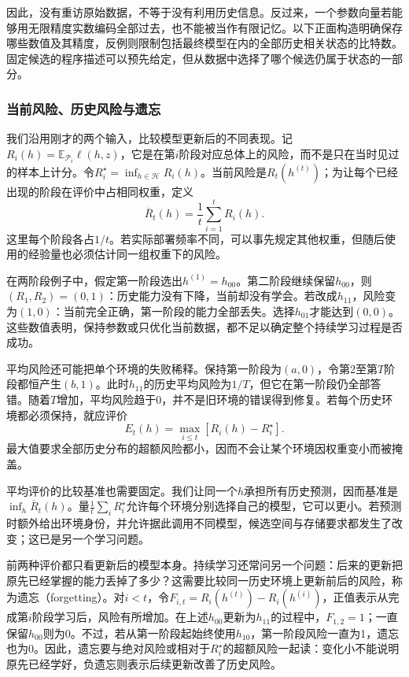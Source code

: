 因此，没有重访原始数据，不等于没有利用历史信息。反过来，一个参数向量若能够用无限精度实数编码全部过去，也不能被当作有限记忆。以下正面构造明确保存哪些数值及其精度，反例则限制包括最终模型在内的全部历史相关状态的比特数。固定候选的程序描述可以预先给定，但从数据中选择了哪个候选仍属于状态的一部分。

\subsubsection{当前风险、历史风险与遗忘}

我们沿用刚才的两个输入，比较模型更新后的不同表现。记$R_i(h)=\mathbb E_{\mathcal P_i}\ell(h,z)$，它是在第$i$阶段对应总体上的风险，而不是只在当时见过的样本上计分。令$R_i^\star=\inf_{h\in\mathcal H}R_i(h)$。当前风险是$R_t(h^{(t)})$；为让每个已经出现的阶段在评价中占相同权重，定义
\begin{equation}
 \overline R_t(h)=\frac1t\sum_{i=1}^tR_i(h).
 \label{eq:continual-average-risk}
\end{equation}
这里每个阶段各占$1/t$。若实际部署频率不同，可以事先规定其他权重，但随后使用的经验量也必须估计同一组权重下的风险。

在两阶段例子中，假定第一阶段选出$h^{(1)}=h_{00}$。第二阶段继续保留$h_{00}$，则$(R_1,R_2)=(0,1)$：历史能力没有下降，当前却没有学会。若改成$h_{11}$，风险变为$(1,0)$：当前完全正确，第一阶段的能力全部丢失。选择$h_{01}$才能达到$(0,0)$。这些数值表明，保持参数或只优化当前数据，都不足以确定整个持续学习过程是否成功。

平均风险还可能把单个环境的失败稀释。保持第一阶段为$(a,0)$，令第2至第$T$阶段都恒产生$(b,1)$。此时$h_{11}$的历史平均风险为$1/T$，但它在第一阶段仍全部答错。随着$T$增加，平均风险趋于0，并不是旧环境的错误得到修复。若每个历史环境都必须保持，就应评价
\[
 E_t(h)=\max_{i\leq t}[R_i(h)-R_i^\star].
\]
最大值要求全部历史分布的超额风险都小，因而不会让某个环境因权重变小而被掩盖。

平均评价的比较基准也需要固定。我们让同一个$h$承担所有历史预测，因而基准是$\inf_h\overline R_t(h)$。量$\frac1t\sum_iR_i^\star$允许每个环境分别选择自己的模型，它可以更小。若预测时额外给出环境身份，并允许据此调用不同模型，候选空间与存储要求都发生了改变；这已是另一个学习问题。

前两种评价都只看更新后的模型本身。持续学习还常问另一个问题：后来的更新把原先已经掌握的能力丢掉了多少？这需要比较同一历史环境上更新前后的风险，称为遗忘（forgetting）。对$i<t$，令$F_{i,t}=R_i(h^{(t)})-R_i(h^{(i)})$，正值表示从完成第$i$阶段学习后，风险有所增加。在上述$h_{00}$更新为$h_{11}$的过程中，$F_{1,2}=1$；一直保留$h_{00}$则为0。不过，若从第一阶段起始终使用$h_{10}$，第一阶段风险一直为1，遗忘也为0。因此，遗忘要与绝对风险或相对于$R_i^\star$的超额风险一起读：变化小不能说明原先已经学好，负遗忘则表示后续更新改善了历史风险。

